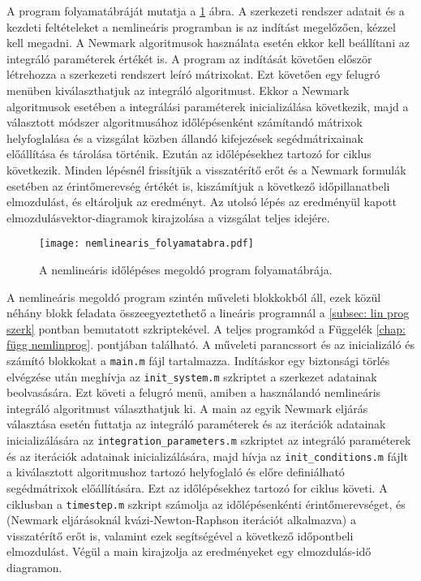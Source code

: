 A program folyamatábráját mutatja a \ref{fig:nemlinprog} ábra. A szerkezeti rendszer adatait és a kezdeti feltételeket a nemlineáris programban is az indítást megelőzően, kézzel kell  megadni. A Newmark algoritmusok használata esetén ekkor kell beállítani az integráló paraméterek értékét is. A program az indítását követően először létrehozza a szerkezeti rendszert leíró mátrixokat. Ezt követően egy felugró menüben kiválaszthatjuk az integráló algoritmust. Ekkor a Newmark algoritmusok esetében a integrálási paraméterek inicializálása következik, majd a választott módszer algoritmusához időlépésenként számítandó mátrixok helyfoglalása  és  a vizsgálat közben állandó kifejezések segédmátrixainak előállítása és tárolása történik. Ezután az időlépésekhez tartozó for ciklus következik. Minden lépésnél frissítjük a visszatérítő erőt és a Newmark formulák esetében az érintőmerevség értékét is, kiszámítjuk a következő időpillanatbeli elmozdulást, és eltároljuk az eredményt. Az utolsó lépés az eredményül kapott  elmozdulásvektor-diagramok kirajzolása a vizsgálat teljes idejére. 
 
\begin{figure}[h!]
\centering
\texttt{[image: nemlinearis\_folyamatabra.pdf]}
\caption{A nemlineáris időlépéses megoldó program folyamatábrája.}
\label{fig:nemlinprog}
\end{figure}

A nemlineáris megoldó program szintén műveleti blokkokból áll, ezek közül néhány blokk feladata összeegyeztethető a lineáris programnál a \ref{subsec: lin prog szerk} pontban bemutatott szkriptekével. A teljes programkód a Függelék \ref{chap: függ nemlinprog}. pontjában található. A  műveleti parancssort és az inicializáló és számító blokkokat a \verb|main.m| fájl tartalmazza. Indításkor egy biztonsági törlés elvégzése után meghívja az \verb|init_system.m| szkriptet a szerkezet adatainak beolvasására. Ezt követi a felugró menü, amiben a használandó nemlineáris integráló algoritmust választhatjuk ki. A main az egyik Newmark eljárás választása esetén futtatja  az integráló paraméterek és az iterációk adatainak inicializálására az \verb|integration_parameters.m| szkriptet az integráló paraméterek és az iterációk adatainak inicializálására, majd hívja az \verb|init_conditions.m| fájlt a kiválasztott algoritmushoz tartozó helyfoglaló és  előre definiálható segédmátrixok előállítására. Ezt az időlépésekhez tartozó for ciklus követi. A ciklusban a \verb|timestep.m| szkript számolja az időlépésenkénti érintőmerevséget, és (Newmark eljárásoknál kvázi-Newton-Raphson iterációt alkalmazva) a visszatérítő erőt is, valamint ezek segítségével a következő időpontbeli elmozdulást. Végül a main kirajzolja az eredményeket egy elmozdulás-idő diagramon.

